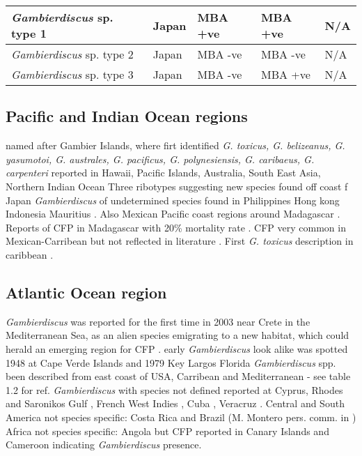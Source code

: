 \documentclass[12pt]{article}
\begin{document}
\begin{landscape}
\begin{longtable}{ | p{2.5cm} | p{7cm} | p{3cm} | p{3cm} | p{3.5cm} | }
	\hline
	\emph{Gambierdiscus} sp. type 1 & Japan \cite{nishimura2013genetic} & MBA +ve \cite{nishimura2013genetic} & MBA +ve \cite{nishimura2013genetic} & N/A \\
	\hline
	\emph{Gambierdiscus} sp. type 2 & Japan \cite{nishimura2013genetic} & MBA -ve \cite{nishimura2013genetic} & MBA -ve \cite{nishimura2013genetic} & N/A \\
	\hline
	\emph{Gambierdiscus} sp. type 3 & Japan \cite{nishimura2013genetic} & MBA -ve \cite{nishimura2013genetic} & MBA +ve \cite{nishimura2013genetic} & N/A \\
	\hline
	\end{longtable}
	\end{landscape}
	\FloatBarrier
\subsection{Pacific and Indian Ocean regions}
named after Gambier Islands, where firt identified \cite{adachi1979thecal}
\emph{G. toxicus, G. belizeanus, G. yasumotoi, G. australes, G. pacificus, G. polynesiensis, G. caribaeus, G. carpenteri} reported in Hawaii, Pacific Islands, Australia, South East Asia, Northern Indian Ocean %
Three ribotypes suggesting new species found off coast f Japan \cite{nishimura2013genetic}
\emph{Gambierdiscus} of undetermined species found in Philippines \cite{gillespie1987possible} Hong kong \cite{lu2004harmful} Indonesia \cite{praseno1996hab} Mauritius \cite{hurbungs2002seasonal}. Also Mexican Pacific coast \cite{ceballos2006analisis} regions around Madagascar \cite{grzebyk1994ecology}. 
Reports of CFP in Madagascar with 20\% mortality rate \cite{habermehl1994severe}. CFP very common in Mexican-Carribean but not reflected in literature \cite{hernandez2004species}.
First \emph{G. toxicus} description in caribbean \cite{besada1982observations}.

\subsection{Atlantic Ocean region}
\emph{Gambierdiscus} was reported for the first time in 2003 near Crete in the Mediterranean Sea, as an alien species emigrating to a new habitat, which could herald an emerging region for CFP \cite{aligizaki2008morphological}.
early \emph{Gambierdiscus} look alike was spotted 1948 at Cape Verde Islands \cite{silva1956contribution} and 1979 Key Largos Florida \cite{taylor1979description}
\emph{Gambierdiscus} spp. been described from east coast of USA, Carribean and Mediterranean - see table 1.2 for ref.
\emph{Gambierdiscus} with species not defined reported at Cyprus, Rhodes and Saronikos Gulf \cite{aligizaki2009toxic,aligizaki2010diversity}, French West Indies \cite{lobel1988assessment}, Cuba \cite{delgado2006epiphytic}, Veracruz \cite{okolodkov2007seasonal}.
Central and South America not species specific: Costa Rica and Brazil (M. Montero pers. comm. in \cite{parsons2012gambierdiscus})
Africa not species specific: Angola \cite{berdalet2012global} but CFP reported in Canary Islands and Cameroon \cite{bienfang2008ciguatera} indicating \emph{Gambierdiscus} presence.
\end{document}
